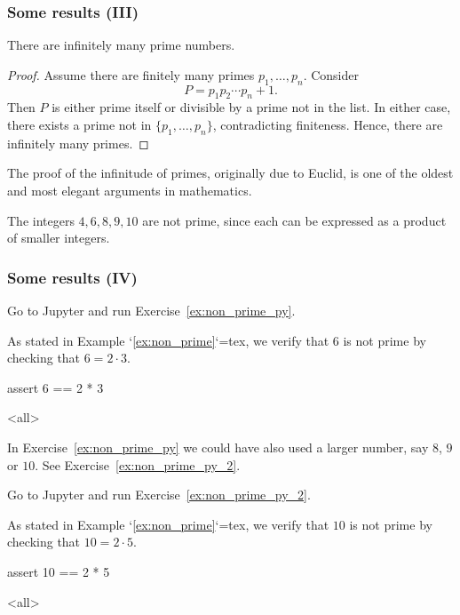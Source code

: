 \begin{frame}
\frametitle{Some results (III)}
\begin{proposition}
There are infinitely many prime numbers.
\end{proposition}

\begin{proof}
Assume there are finitely many primes \(p_1,\dots,p_n\). Consider
\[
P = p_1 p_2 \cdots p_n + 1.
\]
Then \(P\) is either prime itself or divisible by a prime not in the list. In either case, there exists a prime not in \(\{p_1,\dots,p_n\}\), contradicting finiteness. Hence, there are infinitely many primes.
\end{proof}

\begin{remark}[Euclid]
The proof of the infinitude of primes, originally due to Euclid, is one of the oldest and most elegant arguments in mathematics.
\end{remark}

\begin{example}
The integers $4, 6, 8, 9, 10$ are not prime, since each can be expressed as a product of smaller integers.
\label{ex:non_prime}
\end{example}
\end{frame}

\begin{frame}
\frametitle{Some results (IV)}
\begin{pyexercise}{Go to Jupyter and run Exercise~\ref{ex:non_prime_py}.}
\begin{mdcell}
As stated in Example `\ref{ex:non_prime}`{=tex}, we verify that $6$ is not prime by checking that $6 = 2 \cdot 3$.
\end{mdcell}
\begin{pycell}
assert 6 == 2 * 3
\end{pycell}
\mode<all>
\label{ex:non_prime_py}
\end{pyexercise}

\begin{remark}
In Exercise~\ref{ex:non_prime_py} we could have also used a larger number, say $8$, $9$ or $10$. See Exercise~\ref{ex:non_prime_py_2}.
\end{remark}

\begin{pyexercise}{Go to Jupyter and run Exercise~\ref{ex:non_prime_py_2}.}
\begin{mdcell}
As stated in Example `\ref{ex:non_prime}`{=tex}, we verify that $10$ is not prime by checking that $10 = 2 \cdot 5$.
\end{mdcell}
\begin{pycell}
assert 10 == 2 * 5
\end{pycell}
\mode<all>
\label{ex:non_prime_py_2}
\end{pyexercise}
\end{frame}
